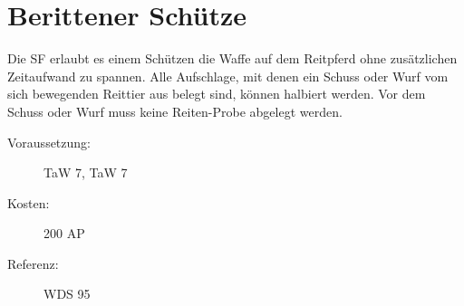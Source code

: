 \section{Berittener Schütze}
\label{sf.berittener_schuetze}
Die SF  erlaubt es einem Schützen die Waffe auf dem Reitpferd ohne zusätzlichen Zeitaufwand zu spannen.
Alle Aufschlage, mit denen ein Schuss oder Wurf vom sich bewegenden Reittier aus belegt sind, können halbiert werden. 
Vor dem Schuss oder Wurf muss keine Reiten-Probe abgelegt werden.
\begin{description}
    \item[Voraussetzung:]
        TaW  7, TaW  7
    \item [Kosten:]
        200 AP
    \item [Referenz:]
        WDS 95
\end{description}
